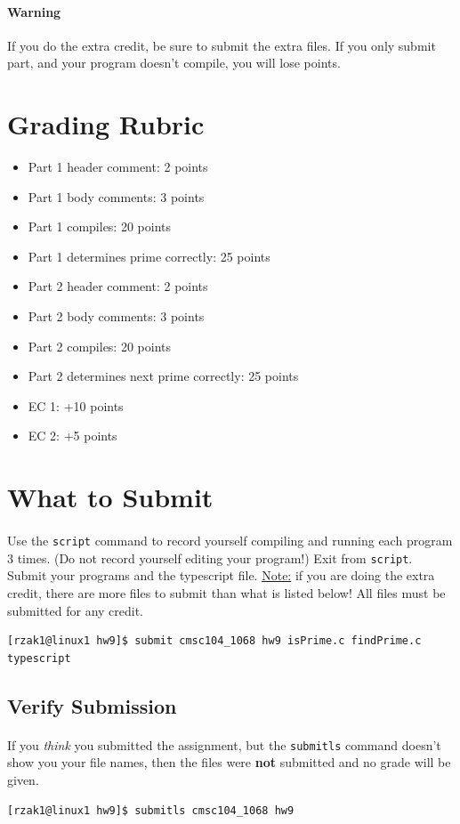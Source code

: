 \documentclass[letter,11pt]{article}
\begin{document}
\paragraph{Warning}If you do the extra credit, be sure to submit the extra files. If you only submit part, and your program doesn't compile, you will lose points.

\section*{Grading Rubric}
\begin{itemize}
    \item Part 1 header comment: 2 points
    \item Part 1 body comments: 3 points
    \item Part 1 compiles: 20 points
    \item Part 1 determines prime correctly: 25 points
    \item Part 2 header comment: 2 points
    \item Part 2 body comments: 3 points
    \item Part 2 compiles: 20 points
    \item Part 2 determines next prime correctly: 25 points
    \item EC 1: +10 points
    \item EC 2:  +5 points
\end{itemize}

\section*{What to Submit}
\paragraph{}Use the \texttt{script} command to record yourself compiling and running each program 3 times. (Do not record yourself editing your program!) Exit from \texttt{script}. Submit your programs and the typescript file. \underline{Note:} if you are doing the extra credit, there are more files to submit than what is listed below! All files must be submitted for any credit.
\begin{verbatim}
[rzak1@linux1 hw9]$ submit cmsc104_1068 hw9 isPrime.c findPrime.c typescript
\end{verbatim}

\subsection*{Verify Submission}
\paragraph{}If you \textit{think} you submitted the assignment, but the \texttt{submitls} command doesn't show you your file names, then the files were \textbf{not} submitted and no grade will be given.
\begin{verbatim}
[rzak1@linux1 hw9]$ submitls cmsc104_1068 hw9
\end{verbatim}
\end{document}
